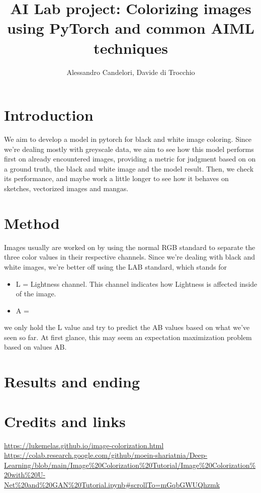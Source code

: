\documentclass{article}
\title{AI Lab project: Colorizing images using PyTorch and common AIML techniques  }
\author{Alessandro Candelori, Davide di Trocchio}
\begin{document}
\maketitle
\newpage
\tableofcontents
\newpage


\section{Introduction}
We aim to develop a model in pytorch for black and white image coloring. Since we're dealing mostly 
with greyscale data, we aim to see how this model performs first on already encountered images, 
providing a metric for judgment based on on a ground truth, the black and white image and the model result. 
Then, we check its performance, and maybe work a little longer to see how it behaves on sketches, 
vectorized images and mangas. 

\section{Method}
Images usually are worked on by using the normal RGB standard to separate the three color values in 
their respective channels. Since we're dealing with black and white images, we're better off using the 
LAB standard, which stands for \begin{itemize}
    \item L = Lightness channel. This channel indicates how Lightness is affected inside 
            of the image. 
    \item A = 

\end{itemize}

we only hold the L value and try to predict the AB values 
based on what we've seen so far. At first glance, this may seem an expectation maximization problem
based on values AB.  

\section{Results and ending}


\section{Credits and links}
\url{https://lukemelas.github.io/image-colorization.html} \\ 
\url{https://colab.research.google.com/github/moein-shariatnia/Deep-Learning/blob/main/Image%20Colorization%20Tutorial/Image%20Colorization%20with%20U-Net%20and%20GAN%20Tutorial.ipynb#scrollTo=mGqbGWUQhzmk}
\end{document}
